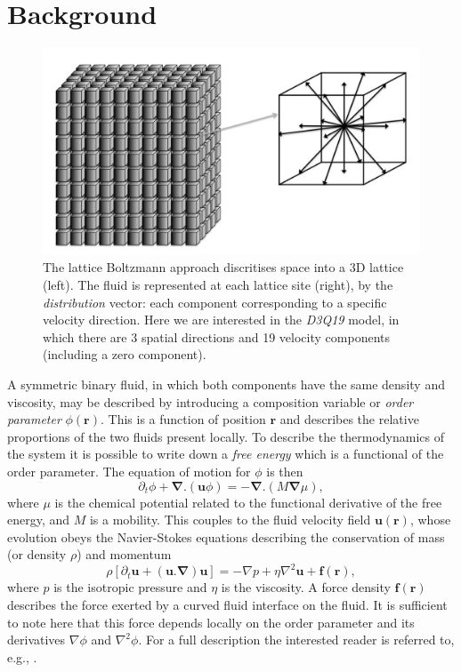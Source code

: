 \section{Background}\label{ch14:sec:background}

\begin{figure}[!t]
\centering
\includegraphics[width=12cm]{Chapters/chapter14/figures/basiclattice}
\caption{The lattice Boltzmann approach discritises space into a 3D lattice (left). The fluid is represented at each lattice site (right), by the {\it distribution} vector: each component corresponding to a specific velocity direction. Here we are interested in the {\it D3Q19} model, in which there are 3 spatial directions and 19 velocity components (including a zero component).}
\label{ch14:fig:basiclattice}
\end{figure}

A symmetric binary fluid, in which both components have the same
density and viscosity, may be described by introducing a composition
variable or \textit{order parameter} $\phi(\mathbf{r})$. This is
a function of position $\mathbf{r}$ and describes the relative
proportions of the two fluids present locally. To describe the
thermodynamics of the system it is possible to write down a
\textit{free energy} which is a functional of the order parameter.
The equation of motion for $\phi$ is then
\begin{equation}
\partial_t \phi + \mathbf{\nabla}.(\mathbf{u}\phi) = 
- \mathbf{\nabla} . (M \mathbf{\nabla}\mu),
\label{cahn-hilliard}
\end{equation}
where $\mu$ is the chemical potential related to the functional derivative
of the free energy, and $M$ is a mobility. This couples
to the fluid velocity field $\mathbf{u}(\mathbf{r})$, whose evolution
obeys the Navier-Stokes equations describing the conservation of mass
(or density $\rho$) and momentum
\begin{equation}
\rho  [ \partial_t \mathbf{u} + (\mathbf{u}.\mathbf{\nabla})\mathbf{u} ]
= -\nabla p + \eta \nabla^2 \mathbf{u} + \mathbf{f}(\mathbf{r}),
\end{equation}
where $p$ is the isotropic pressure and $\eta$ is the viscosity.
A force density
$\mathbf{f}(\mathbf{r})$  describes the force exerted by a
curved fluid interface on the fluid. It is sufficient to note
here that this force depends locally on the order parameter and its
derivatives $\nabla\phi$ and $\nabla^2 \phi$. For a full
description the interested reader is referred to, e.g.,
\cite{bray1994,kendon2001}.

